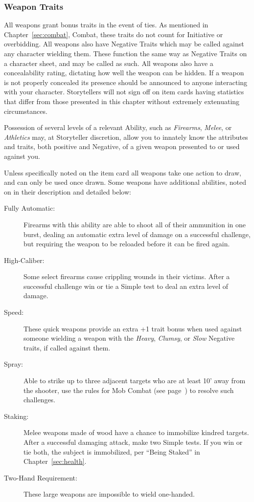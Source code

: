 \subsubsection{Weapon Traits}
All weapons grant bonus traits in the event of ties.  As mentioned in 
Chapter~\ref{sec:combat}, Combat, these traits do not count for Initiative or 
overbidding. All weapons also have Negative Traits which may be called against any 
character wielding them.  These function the same way as Negative Traits on a character 
sheet, and may be called as such.  All weapons also have a concealability rating, dictating 
how well the weapon can be hidden.  If a weapon is not properly concealed its presence 
should be announced to anyone interacting with your character.  Storytellers will not 
sign off on item cards having statistics that differ from those presented in this 
chapter without extremely extenuating circumstances.

Possession of several levels of a relevant Ability, such as \emph{Firearms}, \emph{Melee}, or 
\emph{Athletics} may, at Storyteller discretion, allow you to innately know the attributes and 
traits, both positive and Negative, of a given weapon presented to or used against you.

Unless specifically noted on the item card all weapons take one action to draw, and can 
only be used once drawn.  Some weapons have additional abilities, noted on in their 
description and detailed below:

\begin{description}
	\item[Fully Automatic:]  Firearms with this ability are able to shoot all of 
	their ammunition in one burst, dealing an automatic extra level of damage 
	on a successful challenge, but requiring the weapon to be reloaded before it 
	can be fired again.
	\item[High-Caliber:]  Some select firearms cause crippling wounds in their 
	victims.  After a successful challenge win or tie a Simple test to deal an 
	extra level of damage.
	\item[Speed:]  These quick weapons provide an extra +1 trait bonus when used 
	against someone wielding a weapon with the \emph{Heavy}, \emph{Clumsy}, or 
	\emph{Slow} Negative traits, if called against them.
	\item[Spray:]  Able to strike up to three adjacent targets who are at least 10' 
	away from the shooter, use the rules for Mob Combat (see page~\pageref{subsec:mobcombat}) 
	to resolve such challenges.
	\item[Staking:]  Melee weapons made of wood have a chance to immobilize kindred 
	targets.  After a successful damaging attack, make two Simple tests.  If you win 
	or tie both, the subject is immobilized, per ``Being Staked'' in Chapter~\ref{sec:health}.
	\item[Two-Hand Requirement:]  These large weapons are impossible to wield one-handed.
\end{description}

